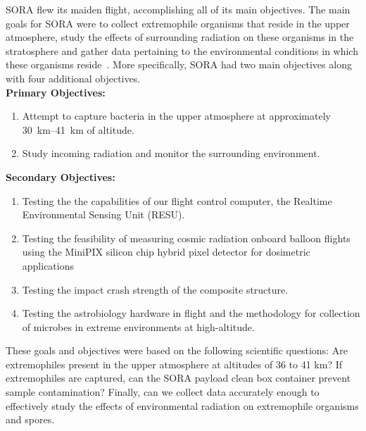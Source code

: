 SORA flew its maiden flight, accomplishing all of its main objectives.  The main goals for SORA were to collect extremophile organisms that reside in the upper atmosphere, study the effects of surrounding radiation on these organisms in the stratosphere and gather data pertaining to the environmental conditions in which these organisms reside~\cite{SORA}.  More specifically, SORA had two main objectives along with four additional objectives.\\
{\bf Primary Objectives:}
	\begin{enumerate}
	\item Attempt to capture bacteria in the upper atmosphere at approximately \SIrange{30}{41}{\kilo\meter} of altitude.
	\item Study incoming radiation and monitor the surrounding environment.
	\end{enumerate}
{\bf Secondary Objectives:}
	\begin{enumerate}
	\item Testing the the capabilities of our flight control computer, the Realtime Environmental Sensing Unit (RESU).
	\item Testing the feasibility of measuring cosmic radiation onboard balloon flights using the MiniPIX silicon chip hybrid pixel detector for dosimetric applications
	\item Testing the impact crash strength of the composite structure.
	\item Testing the astrobiology hardware in flight and the methodology for collection of microbes in extreme environments at high-altitude.
	\end{enumerate}


These goals and objectives were based on the following scientific questions: Are extremophiles present in the upper atmosphere at altitudes of 36 to 41 km?  If extremophiles are captured, can the SORA payload clean box container prevent sample contamination? Finally, can we collect data accurately enough to effectively study the effects of environmental radiation on extremophile organisms and spores.



